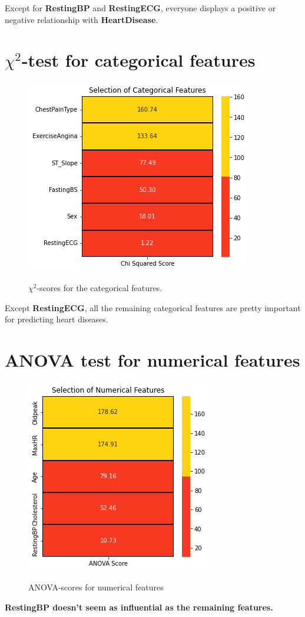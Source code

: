 Except for \textbf{RestingBP} and \textbf{RestingECG}, everyone displays a positive or negative relationship with \textbf{HeartDisease}.

\section{$\chi^2$-test for categorical features}
\begin{figure}[!htpb]
    \centering
    \includegraphics[width=0.6\linewidth]{Figures/Outputs/chi-sq.png}
    \label{Chi-squared scores for various features}
    \caption{$\chi^2$-scores for the categorical features.}
\end{figure}

Except \textbf{RestingECG}, all the remaining categorical features are pretty important for predicting heart diseases.

\section{ANOVA test for numerical features}
\begin{figure}[!htpb]
    \centering
    \includegraphics[width=0.6\linewidth]{Figures/Outputs/anova.png}
    \label{ANOVA for numerical features}
    \caption{ANOVA-scores for numerical features}
\end{figure}

\textbf{RestingBP doesn't seem as influential as the remaining features.}